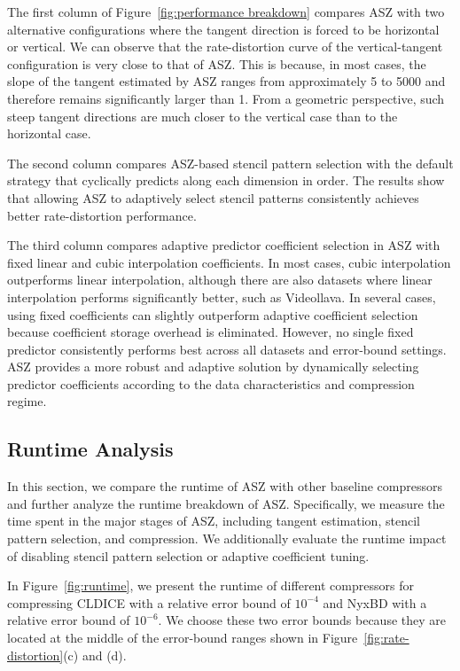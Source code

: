 The first column of Figure~\ref{fig:performance breakdown} compares ASZ with two alternative configurations where the tangent direction is forced to be horizontal or vertical. We can observe that the rate-distortion curve of the vertical-tangent configuration is very close to that of ASZ. This is because, in most cases, the slope of the tangent estimated by ASZ ranges from approximately 5 to 5000 and therefore remains significantly larger than 1. From a geometric perspective, such steep tangent directions are much closer to the vertical case than to the horizontal case.

The second column compares ASZ-based stencil pattern selection with the default strategy that cyclically predicts along each dimension in order. The results show that allowing ASZ to adaptively select stencil patterns consistently achieves better rate-distortion performance.

The third column compares adaptive predictor coefficient selection in ASZ with fixed linear and cubic interpolation coefficients. In most cases, cubic interpolation outperforms linear interpolation, although there are also datasets where linear interpolation performs significantly better, such as Videollava. In several cases, using fixed coefficients can slightly outperform adaptive coefficient selection because coefficient storage overhead is eliminated. However, no single fixed predictor consistently performs best across all datasets and error-bound settings. ASZ provides a more robust and adaptive solution by dynamically selecting predictor coefficients according to the data characteristics and compression regime.

\subsection{Runtime Analysis}

In this section, we compare the runtime of ASZ with other baseline compressors and further analyze the runtime breakdown of ASZ. Specifically, we measure the time spent in the major stages of ASZ, including tangent estimation, stencil pattern selection, and compression. We additionally evaluate the runtime impact of disabling stencil pattern selection or adaptive coefficient tuning.

In Figure~\ref{fig:runtime}, we present the runtime of different compressors for compressing CLDICE with a relative error bound of $10^{-4}$ and NyxBD with a relative error bound of $10^{-6}$. We choose these two error bounds because they are located at the middle of the error-bound ranges shown in Figure~\ref{fig:rate-distortion}(c) and (d).


